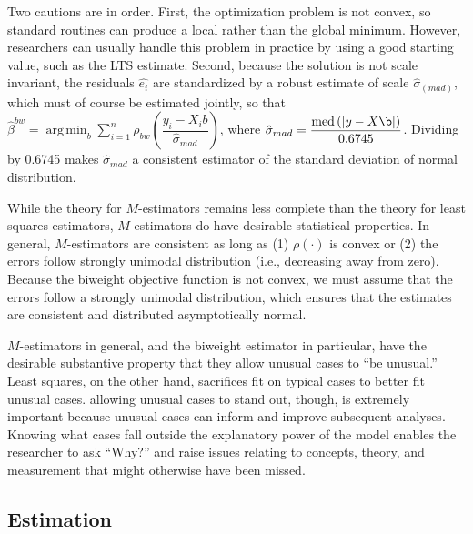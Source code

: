 \documentclass[12pt]{article}
\DeclareMathOperator*{\argmin}{arg\,min}
\DeclareMathOperator{\med}{med}
\begin{document}
Two cautions are in order. 
First, the optimization problem is not convex, so standard routines can produce a local rather than the global minimum. 
However, researchers can usually handle this problem in practice by using a good starting value, such as the LTS estimate. 
Second, because the solution is not scale invariant, the residuals $\hat{e_i}$ are standardized by a robust estimate of scale $\hat{\sigma}_{(mad)}$, which must of course be estimated jointly, so that $\hat{\beta}^{bw} =\argmin_{b} \sum_{i = 1}^n \rho_{bw}\left(\dfrac{y_i - X_ib}{\hat{\sigma}_{mad}}\right)$, where $\hat{\sigma}_{mad} = \dfrac{\med\left( |y - X\b|\right)}{0.6745}$. 
Dividing by 0.6745 makes $\hat{\sigma}_{mad}$ a consistent estimator of the standard deviation of normal distribution.

While the theory for $M$-estimators remains less complete than the theory for least squares estimators, $M$-estimators do have desirable statistical properties. 
In general, $M$-estimators are consistent as long as (1) $\rho(\cdot)$ is convex or (2) the errors follow strongly unimodal distribution (i.e., decreasing away from zero). 
Because the biweight objective function is not convex, we must assume that the errors follow a strongly unimodal distribution, which ensures that the estimates are consistent and distributed asymptotically normal.

$M$-estimators in general, and the biweight estimator in particular, have the desirable substantive property that they allow unusual cases to ``be unusual.''
Least squares, on the other hand, sacrifices fit on typical cases to better fit unusual cases. 
allowing unusual cases to stand out, though, is extremely important because unusual cases can inform and improve subsequent analyses. 
Knowing what cases fall outside the explanatory power of the model enables the researcher to ask ``Why?'' and raise issues relating to concepts, theory, and measurement that might otherwise have been missed.

\subsection*{Estimation}
\end{document}
